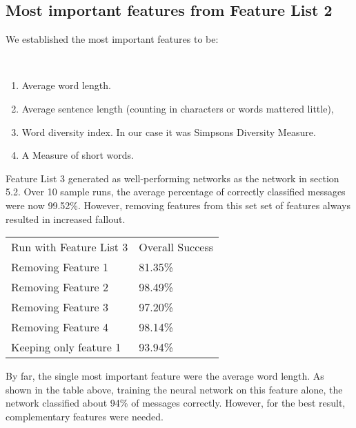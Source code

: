   \subsection{Most important features from Feature List 2}
  We established the most important features to be:
  \label{sec:important-features}
    \begin{poem}\mbox{}\\[-\baselineskip]
      \begin{enumerate} \label{important-features}
        \item Average word length.
        \item Average sentence length (counting in characters or words mattered 
          little), 
        \item Word diversity index. In our case it was Simpsons Diversity
          Measure.  
        \item A Measure of short words. 
      \end{enumerate}     
    \end{poem}
    Feature List $3$ generated as well-performing networks as
    the network in section 5.2.  
    Over 10 sample runs, the average percentage of correctly
    classified messages were now 99.52\%.
    However, removing features from this set set of features always
    resulted in increased fallout. 
    \begin{table}[H]
      \begin{tabular}{ll}
        Run with Feature List 3      & Overall Success  \\
        Removing Feature 1           & 81.35\%          \\
        Removing Feature 2           & 98.49\%          \\ 
        Removing Feature 3           & 97.20\%          \\ 
        Removing Feature 4           & 98.14\%          \\ 
        Keeping only feature 1       & 93.94\%
      \end{tabular}
    \end{table}
    By far, the single most important feature were the average word length.
    As shown in the table above, training the neural network on this feature
    alone, the network classified about 94\% of messages correctly. However,
    for the best result, complementary features were needed.
    
